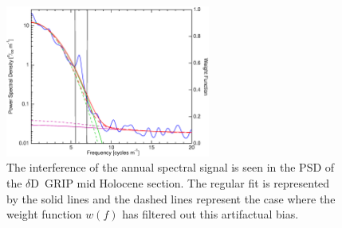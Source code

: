 \documentclass[11pt, draftcls, onecolumn]{IEEEtran} %
\numberwithin{equation}{section}
\numberwithin{table}{section}
\numberwithin{figure}{section}
\newcommand{\delD}{$\delta\mathrm{D}$}
\begin{document}
%


\begin{figure}[]
	\vspace*{2mm}
	\begin{center}
		\includegraphics[width=0.6\textwidth]{Figure_5}
		\caption{The interference of the annual spectral signal is seen
			in the PSD of the \delD~GRIP mid Holocene section. The regular fit is represented by the solid lines
			and the dashed lines represent the case where the weight function $w(f)$ 
			has filtered out this artifactual bias.} \label{fig:filter_function}
	\end{center}
\end{figure}
\end{document}
